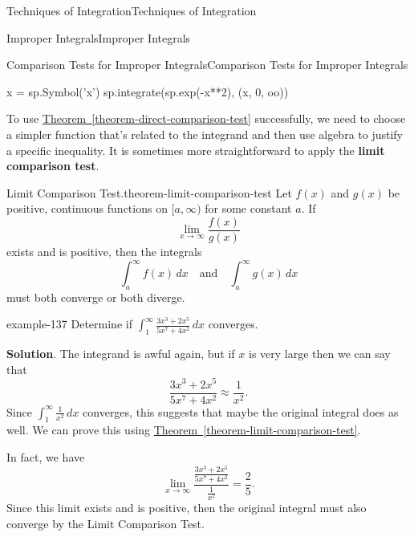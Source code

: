 \documentclass[10pt,]{book}
\newcommand{\terminology}[1]{\textbf{#1}}
\numberwithin{equation}{section}
\begin{document}
\begin{chapterptx}{Techniques of Integration}{}{Techniques of Integration}{}{}
\begin{sectionptx}{Improper Integrals}{}{Improper Integrals}{}{}
\begin{subsectionptx}{Comparison Tests for Improper Integrals}{}{Comparison Tests for Improper Integrals}{}{}
\begin{sageinput}
x = sp.Symbol('x')
sp.integrate(sp.exp(-x**2), (x, 0, oo))
\end{sageinput}
\hypertarget{p-608}{}%
To use \hyperref[theorem-direct-comparison-test]{Theorem~\ref{theorem-direct-comparison-test}} successfully, we need to choose a simpler function that's related to the integrand and then use algebra to justify a specific inequality. It is sometimes more straightforward to apply the \terminology{limit comparison test}.%
\begin{theorem}{Limit Comparison Test.}{}{theorem-limit-comparison-test}%
\hypertarget{p-609}{}%
Let \(f(x)\) and \(g(x)\) be positive, continuous functions on \([a,\infty)\) for some constant \(a\). If%
\begin{equation*}
\lim_{x\to\infty}\frac{f(x)}{g(x)}
\end{equation*}
exists and is positive, then the integrals%
\begin{equation*}
\int_{a}^{\infty}f(x)\,dx\quad\text{and}\quad\int_{a}^{\infty}g(x)\,dx
\end{equation*}
must both converge or both diverge.%
\end{theorem}
\begin{example}{}{example-137}%
\hypertarget{p-610}{}%
Determine if \(\displaystyle\int_{1}^{\infty}\frac{3x^{3} + 2x^{5}}{5x^{7} + 4x^{2}}\,dx\) converges.%
\par\smallskip%
\noindent\textbf{Solution}.\hypertarget{solution-133}{}\quad%
\hypertarget{p-611}{}%
The integrand is awful again, but if \(x\) is very large then we can say that%
\begin{equation*}
\frac{3x^{3} + 2x^{5}}{5x^{7} + 4x^{2}} \approx \frac{1}{x^{2}}.
\end{equation*}
Since \(\int_{1}^{\infty}\frac{1}{x^{2}}\,dx\) converges, this suggests that maybe the original integral does as well. We can prove this using \hyperref[theorem-limit-comparison-test]{Theorem~\ref{theorem-limit-comparison-test}}.%
\par
\hypertarget{p-612}{}%
In fact, we have%
\begin{equation*}
\lim_{x\to\infty}\frac{\frac{3x^{3} + 2x^{5}}{5x^{7} + 4x^{2}}}{\frac{1}{x^{2}}} = \frac{2}{5}.
\end{equation*}
Since this limit exists and is positive, then the original integral must also converge by the Limit Comparison Test.%
\end{example}
\end{subsectionptx}
\end{sectionptx}
\end{chapterptx}
\end{document}

